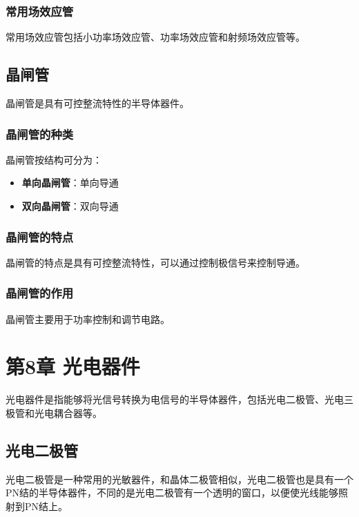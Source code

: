 \documentclass[12pt,UTF8]{ctexbook}
\begin{document}
\subsection{常用场效应管}

常用场效应管包括小功率场效应管、功率场效应管和射频场效应管等。

\section{晶闸管}

晶闸管是具有可控整流特性的半导体器件。

\subsection{晶闸管的种类}

晶闸管按结构可分为：

\begin{itemize}[leftmargin=2cm]
	\item \textbf{单向晶闸管}：单向导通
	\item \textbf{双向晶闸管}：双向导通
\end{itemize}

\subsection{晶闸管的特点}

晶闸管的特点是具有可控整流特性，可以通过控制极信号来控制导通。

\subsection{晶闸管的作用}

晶闸管主要用于功率控制和调节电路。

\chapter{第8章 光电器件}

光电器件是指能够将光信号转换为电信号的半导体器件，包括光电二极管、光电三极管和光电耦合器等。

\section{光电二极管}

光电二极管是一种常用的光敏器件，和晶体二极管相似，光电二极管也是具有一个PN结的半导体器件，不同的是光电二极管有一个透明的窗口，以便使光线能够照射到PN结上。
\end{document}
